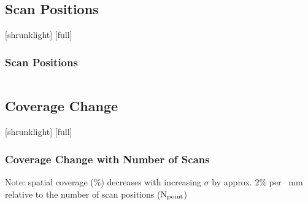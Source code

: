 \documentclass[12pt,compress,aspectratio=169]{beamer} %
\begin{document}
\subsection{Scan Positions}
[shrunklight]
[full]
\begin{frame}[t]
	\frametitle{Scan Positions}
	\begin{columns}
	
	\begin{column}{0.5\textwidth}
	\end{column}
	
	
	\begin{column}{0.5\textwidth}
	\end{column}
	\end{columns}
\end{frame}	


\subsection{Coverage Change}
[shrunklight] 
[full]
\begin{frame}[t]
	\frametitle{Coverage Change with Number of Scans}
	\centering	
	\begin{center}
	\vspace{-0.5cm} %
	\end{center}
	
	Note: spatial coverage (\%) decreases with increasing $\sigma$ by approx. 2\% per \SI{}{\milli\metre} relative to the number of scan positions ($\operatorname{N}_{\operatorname{point}}$)
\end{frame}
\end{document}
